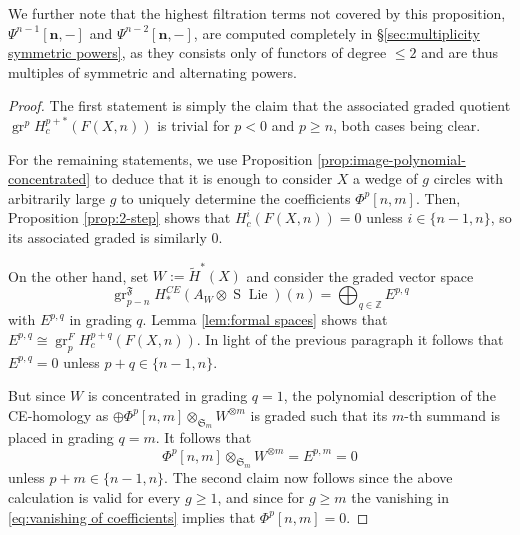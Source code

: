 \documentclass[12pt]{article}
\newcommand{\SymGroup}[1][n]{\mathfrak{S}_{#1}}
\newcommand{\n}[1][n]{\mathbf{#1}}
\DeclareMathOperator{\gr}{gr}
\DeclareMathOperator{\Lie}{Lie}
\DeclareMathOperator{\Suspension}{S}
\theoremstyle{plain}
\theoremstyle{definition}
\theoremstyle{remark}
\begin{document}
We further note that the highest filtration terms not covered by this proposition, $\Psi^{n-1}[\n,-]$ and $\Psi^{n-2}[\n,-]$, are computed completely in \S\ref{sec:multiplicity symmetric powers}, as they consists only of functors of degree $\leq 2$ and are thus multiples of symmetric and alternating powers.
\begin{proof}
    The first statement is simply the claim that the associated graded quotient $\gr^p H_c^{p+*}(F(X, n))$ is trivial for $p<0$ and $p\geq n$, both cases being clear.
    
    For the remaining statements, we use Proposition \ref{prop:image-polynomial-concentrated} to deduce that it is enough to consider $X$ a wedge of $g$ circles with arbitrarily large $g$ to uniquely determine the coefficients $\Phi^p[n,m]$. Then, Proposition \ref{prop:2-step} shows that $H^i_c(F(X,n))=0$ unless $i\in \{n-1,n\}$, so its associated graded is similarly $0$.

    On the other hand, set $W := \tilde{H}^*(X)$ and consider the graded vector space
    \[
    \gr_{p-n}^{\mathfrak{F}} H^{CE}_{\ast}(A_W\otimes\Suspension\Lie)(n) = \bigoplus_{q\in \mathbb{Z}} E^{p,q}
    \]
    with $E^{p,q}$ in grading $q$. Lemma \ref{lem:formal spaces} shows that $E^{p,q} \cong \gr_p^F H^{p+q}_c(F(X,n))$. In light of the previous paragraph it follows that $E^{p,q} = 0$ unless $p+q\in \{n-1,n\}$.
    
    But since $W$ is concentrated in grading $q=1$, the polynomial description of the CE-homology as $\oplus \Phi^p[n,m]\otimes_{\SymGroup[m]}W^{\otimes m}$ is graded such that its $m$-th summand is placed in grading $q=m$. It follows that 
    \begin{equation} \label{eq:vanishing of coefficients}
     \Phi^p[n,m]\otimes_{\SymGroup[m]}W^{\otimes m} = E^{p,m} =0
    \end{equation}
    unless $p+m\in \{n-1,n\}$. The second claim now follows since the above calculation is valid for every $g\geq 1$, and since for $g\geq m$ the vanishing in \eqref{eq:vanishing of coefficients} implies that $\Phi^p[n,m]=0$.
    
    

\end{proof}
\end{document}
